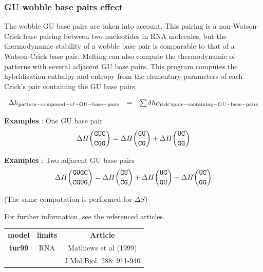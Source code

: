 \documentclass{article}
\begin{document}
\pagebreak
\subsubsection{GU wobble base pairs effect}

The wobble GU base pairs are taken into account. This pairing is a non-Watson-Crick base pairing between two nucleotides 
in RNA molecules, but the thermodynamic stability of a wobble base pair is comparable to that of a Watson-Crick base pair.
Melting can also compute the thermodynamic of patterns with several adjacent GU base pairs.
This program computes the hybridisation enthalpy and entropy from the elementary 
parameters of each Crick's pair containing the GU base pairs.

\begin{displaymath}
  \begin{array}[t]{ccc}
  \Delta{}h_\mathrm{pattern-composed-of-GU-base-pairs}&=&\sum \delta{}h_\mathrm{Crick's pair-containing-GU-base-pairs}\\
  \end{array}
\end{displaymath}

\textbf{Examples} : One GU base pair
\begin{multline*}
\Delta H {\mbox{\texttt{GUC}} \choose \mbox{\texttt{CGG}}} = 
\Delta H {\mbox{\texttt{GU}} \choose \mbox{\texttt{CG}}} +
\Delta H {\mbox{\texttt{UC}} \choose \mbox{\texttt{GG}}}\\
\end{multline*}

\textbf{Examples} : Two adjacent GU base pairs
\begin{multline*}
\Delta H {\mbox{\texttt{GUGC}} \choose \mbox{\texttt{CGUG}}} = 
\Delta H {\mbox{\texttt{GU}} \choose \mbox{\texttt{CG}}} +
\Delta H {\mbox{\texttt{UG}} \choose \mbox{\texttt{GU}}} +
\Delta H {\mbox{\texttt{UC}} \choose \mbox{\texttt{GG}}}\\
\end{multline*}

       (The same computation is performed for $\Delta S$) 

       
For further information, see the referenced articles.

\begin{table}[hc]
\begin{tabular}[h]{| c | c | c |}
\hline
\textbf{model} & \textbf{limits} & \textbf{Article} \\
\textbf{tur99} & RNA & Mathiews et al (1999) \\
 & & J.Mol.Biol.  288: 911-940 \\
\hline
\end{tabular}
\end{table}
\end{document}
